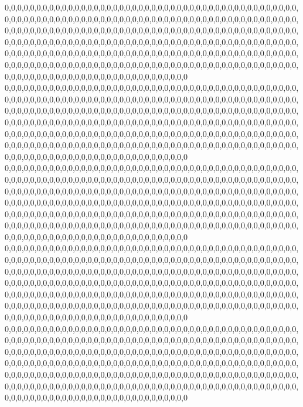 0,0,0,0,0,0,0,0,0,0,0,0,0,0,0,0,0,0,0,0,0,0,0,0,0,0,0,0,0,0,0,0,0,0,0,0,0,0,0,0,0,0,0,0,0,0,0,0,0,0,0,0,0,0,0,0,0,0,0,0,0,0,0,0,0,0,0,0,0,0,0,0,0,0,0,0,0,0,0,0,0,0,0,0,0,0,0,0,0,0,0,0,0,0,0,0,0,0,0,0,0,0,0,0,0,0,0,0,0,0,0,0,0,0,0,0,0,0,0,0,0,0,0,0,0,0,0,0,0,0,0,0,0,0,0,0,0,0,0,0,0,0,0,0,0,0,0,0,0,0,0,0,0,0,0,0,0,0,0,0,0,0,0,0,0,0,0,0,0,0,0,0,0,0,0,0,0,0,0,0,0,0,0,0,0,0,0,0,0,0,0,0,0,0,0,0,0,0,0,0,0,0,0,0,0,0,0,0,0,0,0,0,0,0,0,0,0,0,0,0,0,0,0,0,0,0,0,0,0,0,0,0,0,0,0,0,0,0,0,0,0,0,0,0,0,0,0,0,0,0,0,0,0,0,0,0,0,0,0,0,0,0,0,0,0,0,0,0,0,0,0,0,0,0,0,0,0,0,0,0,0,0,0,0,0,0,0,0,0,0,0,0,0,0,0,0,0,0,0,0,0,0,0,0,0
0,0,0,0,0,0,0,0,0,0,0,0,0,0,0,0,0,0,0,0,0,0,0,0,0,0,0,0,0,0,0,0,0,0,0,0,0,0,0,0,0,0,0,0,0,0,0,0,0,0,0,0,0,0,0,0,0,0,0,0,0,0,0,0,0,0,0,0,0,0,0,0,0,0,0,0,0,0,0,0,0,0,0,0,0,0,0,0,0,0,0,0,0,0,0,0,0,0,0,0,0,0,0,0,0,0,0,0,0,0,0,0,0,0,0,0,0,0,0,0,0,0,0,0,0,0,0,0,0,0,0,0,0,0,0,0,0,0,0,0,0,0,0,0,0,0,0,0,0,0,0,0,0,0,0,0,0,0,0,0,0,0,0,0,0,0,0,0,0,0,0,0,0,0,0,0,0,0,0,0,0,0,0,0,0,0,0,0,0,0,0,0,0,0,0,0,0,0,0,0,0,0,0,0,0,0,0,0,0,0,0,0,0,0,0,0,0,0,0,0,0,0,0,0,0,0,0,0,0,0,0,0,0,0,0,0,0,0,0,0,0,0,0,0,0,0,0,0,0,0,0,0,0,0,0,0,0,0,0,0,0,0,0,0,0,0,0,0,0,0,0,0,0,0,0,0,0,0,0,0,0,0,0,0,0,0,0,0,0,0,0,0,0,0,0,0,0,0,0,0,0,0,0,0,0
0,0,0,0,0,0,0,0,0,0,0,0,0,0,0,0,0,0,0,0,0,0,0,0,0,0,0,0,0,0,0,0,0,0,0,0,0,0,0,0,0,0,0,0,0,0,0,0,0,0,0,0,0,0,0,0,0,0,0,0,0,0,0,0,0,0,0,0,0,0,0,0,0,0,0,0,0,0,0,0,0,0,0,0,0,0,0,0,0,0,0,0,0,0,0,0,0,0,0,0,0,0,0,0,0,0,0,0,0,0,0,0,0,0,0,0,0,0,0,0,0,0,0,0,0,0,0,0,0,0,0,0,0,0,0,0,0,0,0,0,0,0,0,0,0,0,0,0,0,0,0,0,0,0,0,0,0,0,0,0,0,0,0,0,0,0,0,0,0,0,0,0,0,0,0,0,0,0,0,0,0,0,0,0,0,0,0,0,0,0,0,0,0,0,0,0,0,0,0,0,0,0,0,0,0,0,0,0,0,0,0,0,0,0,0,0,0,0,0,0,0,0,0,0,0,0,0,0,0,0,0,0,0,0,0,0,0,0,0,0,0,0,0,0,0,0,0,0,0,0,0,0,0,0,0,0,0,0,0,0,0,0,0,0,0,0,0,0,0,0,0,0,0,0,0,0,0,0,0,0,0,0,0,0,0,0,0,0,0,0,0,0,0,0,0,0,0,0,0,0,0,0,0,0,0
0,0,0,0,0,0,0,0,0,0,0,0,0,0,0,0,0,0,0,0,0,0,0,0,0,0,0,0,0,0,0,0,0,0,0,0,0,0,0,0,0,0,0,0,0,0,0,0,0,0,0,0,0,0,0,0,0,0,0,0,0,0,0,0,0,0,0,0,0,0,0,0,0,0,0,0,0,0,0,0,0,0,0,0,0,0,0,0,0,0,0,0,0,0,0,0,0,0,0,0,0,0,0,0,0,0,0,0,0,0,0,0,0,0,0,0,0,0,0,0,0,0,0,0,0,0,0,0,0,0,0,0,0,0,0,0,0,0,0,0,0,0,0,0,0,0,0,0,0,0,0,0,0,0,0,0,0,0,0,0,0,0,0,0,0,0,0,0,0,0,0,0,0,0,0,0,0,0,0,0,0,0,0,0,0,0,0,0,0,0,0,0,0,0,0,0,0,0,0,0,0,0,0,0,0,0,0,0,0,0,0,0,0,0,0,0,0,0,0,0,0,0,0,0,0,0,0,0,0,0,0,0,0,0,0,0,0,0,0,0,0,0,0,0,0,0,0,0,0,0,0,0,0,0,0,0,0,0,0,0,0,0,0,0,0,0,0,0,0,0,0,0,0,0,0,0,0,0,0,0,0,0,0,0,0,0,0,0,0,0,0,0,0,0,0,0,0,0,0,0,0,0,0,0,0
0,0,0,0,0,0,0,0,0,0,0,0,0,0,0,0,0,0,0,0,0,0,0,0,0,0,0,0,0,0,0,0,0,0,0,0,0,0,0,0,0,0,0,0,0,0,0,0,0,0,0,0,0,0,0,0,0,0,0,0,0,0,0,0,0,0,0,0,0,0,0,0,0,0,0,0,0,0,0,0,0,0,0,0,0,0,0,0,0,0,0,0,0,0,0,0,0,0,0,0,0,0,0,0,0,0,0,0,0,0,0,0,0,0,0,0,0,0,0,0,0,0,0,0,0,0,0,0,0,0,0,0,0,0,0,0,0,0,0,0,0,0,0,0,0,0,0,0,0,0,0,0,0,0,0,0,0,0,0,0,0,0,0,0,0,0,0,0,0,0,0,0,0,0,0,0,0,0,0,0,0,0,0,0,0,0,0,0,0,0,0,0,0,0,0,0,0,0,0,0,0,0,0,0,0,0,0,0,0,0,0,0,0,0,0,0,0,0,0,0,0,0,0,0,0,0,0,0,0,0,0,0,0,0,0,0,0,0,0,0,0,0,0,0,0,0,0,0,0,0,0,0,0,0,0,0,0,0,0,0,0,0,0,0,0,0,0,0,0,0,0,0,0,0,0,0,0,0,0,0,0,0,0,0,0,0,0,0,0,0,0,0,0,0,0,0,0,0,0,0,0,0,0,0,0
